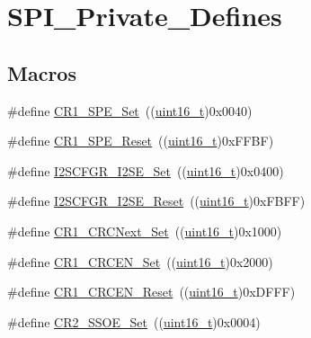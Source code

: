 \hypertarget{group___s_p_i___private___defines}{}\section{S\+P\+I\+\_\+\+Private\+\_\+\+Defines}
\label{group___s_p_i___private___defines}
\subsection*{Macros}
\begin{DoxyCompactItemize}
\item 
\#define \hyperlink{group___s_p_i___private___defines_ga74286f403309d32b56fed10aba2ebf91}{C\+R1\+\_\+\+S\+P\+E\+\_\+\+Set}~((\hyperlink{_p_e___types_8h_a1f1825b69244eb3ad2c7165ddc99c956}{uint16\+\_\+t})0x0040)
\item 
\#define \hyperlink{group___s_p_i___private___defines_ga7074d384e7f175968d1497a9275232bf}{C\+R1\+\_\+\+S\+P\+E\+\_\+\+Reset}~((\hyperlink{_p_e___types_8h_a1f1825b69244eb3ad2c7165ddc99c956}{uint16\+\_\+t})0x\+F\+F\+B\+F)
\item 
\#define \hyperlink{group___s_p_i___private___defines_gaded516c1bc1f0cb578174af3e296621b}{I2\+S\+C\+F\+G\+R\+\_\+\+I2\+S\+E\+\_\+\+Set}~((\hyperlink{_p_e___types_8h_a1f1825b69244eb3ad2c7165ddc99c956}{uint16\+\_\+t})0x0400)
\item 
\#define \hyperlink{group___s_p_i___private___defines_ga0ba63ca824d68ed9a84eafd6f4d64a3a}{I2\+S\+C\+F\+G\+R\+\_\+\+I2\+S\+E\+\_\+\+Reset}~((\hyperlink{_p_e___types_8h_a1f1825b69244eb3ad2c7165ddc99c956}{uint16\+\_\+t})0x\+F\+B\+F\+F)
\item 
\#define \hyperlink{group___s_p_i___private___defines_gaed3a2181ca4095a6488cf6c0ad7a29c6}{C\+R1\+\_\+\+C\+R\+C\+Next\+\_\+\+Set}~((\hyperlink{_p_e___types_8h_a1f1825b69244eb3ad2c7165ddc99c956}{uint16\+\_\+t})0x1000)
\item 
\#define \hyperlink{group___s_p_i___private___defines_gae0b545cdda02753c8e8863e883268011}{C\+R1\+\_\+\+C\+R\+C\+E\+N\+\_\+\+Set}~((\hyperlink{_p_e___types_8h_a1f1825b69244eb3ad2c7165ddc99c956}{uint16\+\_\+t})0x2000)
\item 
\#define \hyperlink{group___s_p_i___private___defines_gadd72ac04e7b2ff17053db04d240e17b1}{C\+R1\+\_\+\+C\+R\+C\+E\+N\+\_\+\+Reset}~((\hyperlink{_p_e___types_8h_a1f1825b69244eb3ad2c7165ddc99c956}{uint16\+\_\+t})0x\+D\+F\+F\+F)
\item 
\#define \hyperlink{group___s_p_i___private___defines_gaae3c2720c0b63d7cc26046969a45a6c1}{C\+R2\+\_\+\+S\+S\+O\+E\+\_\+\+Set}~((\hyperlink{_p_e___types_8h_a1f1825b69244eb3ad2c7165ddc99c956}{uint16\+\_\+t})0x0004)

\end{DoxyCompactItemize}
